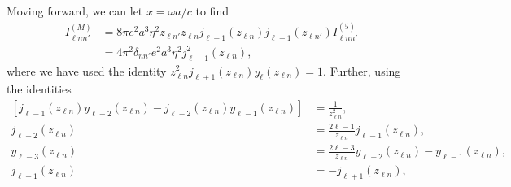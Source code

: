 Moving forward, we can let $x = \omega a/c$ to find
\begin{equation}
\begin{split}
I_{\ell nn'}^{(M)} 
&= 8\pi e^2a^3\eta^2z_{\ell n'}z_{\ell n}j_{\ell - 1}(z_{\ell n})j_{\ell - 1}(z_{\ell n'})I_{\ell nn'}^{(5)}\\
&= 4\pi^2\delta_{nn'}e^2a^3\eta^2j_{\ell - 1}^2(z_{\ell n}),
\end{split}
\end{equation}
where we have used the identity $z_{\ell n}^2j_{\ell + 1}(z_{\ell n})y_{\ell}(z_{\ell n}) = 1$. Further, using the identities
\begin{equation}
\begin{split}
\left[j_{\ell - 1}(z_{\ell n})y_{\ell - 2}(z_{\ell n}) - j_{\ell - 2}(z_{\ell n})y_{\ell - 1}(z_{\ell n})\right] &= \frac{1}{z_{\ell n}^2},\\
j_{\ell - 2}(z_{\ell n}) &= \frac{2\ell - 1}{z_{\ell n}}j_{\ell - 1}(z_{\ell n}),\\
y_{\ell - 3}(z_{\ell n}) &= \frac{2\ell - 3}{z_{\ell n}}y_{\ell - 2}(z_{\ell n}) - y_{\ell - 1}(z_{\ell n}),\\
j_{\ell - 1}(z_{\ell n}) &= -j_{\ell + 1}(z_{\ell n}),
\end{split}
\end{equation}
